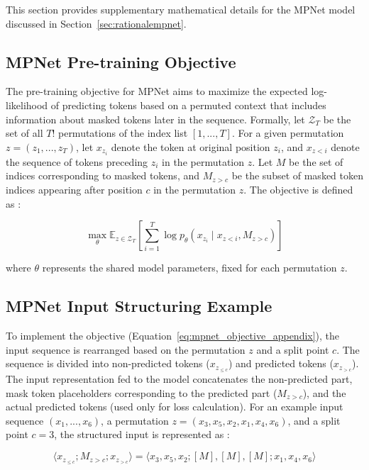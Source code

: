 \documentclass[10pt,oneside]{report}
\begin{document}
This section provides supplementary mathematical details for the MPNet model discussed in Section~\ref{sec:rationalempnet}.

\subsection{MPNet Pre-training Objective}

The pre-training objective for MPNet aims to maximize the expected log-likelihood of predicting tokens based on a permuted context that includes information about masked tokens later in the sequence. Formally, let $\mathcal{Z}_{T}$ be the set of all $T!$ permutations of the index list $[1,...,T]$. For a given permutation $z=(z_{1},...,z_{T})$, let $x_{z_{i}}$ denote the token at original position $z_i$, and $x_{z<i}$ denote the sequence of tokens preceding $z_i$ in the permutation $z$. Let $M$ be the set of indices corresponding to masked tokens, and $M_{z>c}$ be the subset of masked token indices appearing after position $c$ in the permutation $z$. The objective is defined as \cite{song2020mpnet}:

\begin{equation} \label{eq:mpnet_objective_appendix}
\max_{\theta} \mathbb{E}_{z\in\mathcal{Z}_{T}} \left[ \sum_{i=1}^{T} \log p_{\theta}(x_{z_{i}} \mid x_{z<i}, M_{z>c}) \right]
\end{equation}

where $\theta$ represents the shared model parameters, fixed for each permutation $z$.


\subsection{MPNet Input Structuring Example}

To implement the objective (Equation~\ref{eq:mpnet_objective_appendix}), the input sequence is rearranged based on the permutation $z$ and a split point $c$. The sequence is divided into non-predicted tokens ($x_{z_{\le c}}$) and predicted tokens ($x_{z_{>c}}$). The input representation fed to the model concatenates the non-predicted part, mask token placeholders corresponding to the predicted part ($M_{z>c}$), and the actual predicted tokens (used only for loss calculation). For an example input sequence $(x_1, ..., x_6)$, a permutation $z=(x_3, x_5, x_2, x_1, x_4, x_6)$, and a split point $c=3$, the structured input is represented as \cite{song2020mpnet}:

\begin{equation} \label{eq:mpnet_input_appendix}
\langle x_{z_{\le c}}; M_{z>c}; x_{z_{>c}} \rangle = \langle x_3, x_5, x_2; [M], [M], [M]; x_1, x_4, x_6 \rangle
\end{equation}
\end{document}
